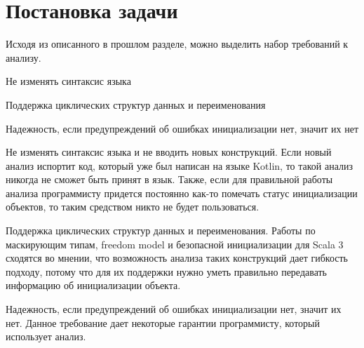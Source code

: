 \chapter{Постановка задачи}\label{ch:постановка-задачи}


Исходя из описанного в прошлом разделе, можно выделить набор требований к анализу.
\begin{itemize*}
    \item Не изменять синтаксис языка
    \item Поддержка циклических структур данных и переименования
    \item Надежность, если предупреждений об ошибках инициализации нет, значит их нет
\end{itemize*}

Не изменять синтаксис языка и не вводить новых конструкций.
Если новый анализ испортит код, который уже был написан на языке Kotlin, то такой анализ никогда не сможет быть принят в язык.
Также, если для правильной работы анализа программисту придется постоянно как-то помечать статус инициализации объектов,
то таким средством никто не будет пользоваться.

Поддержка циклических структур данных и переименования.
Работы по маскирующим типам, freedom model и безопасной инициализации для Scala 3 сходятся во мнении,
что возможность анализа таких конструкций дает гибкость подходу,
потому что для их поддержки нужно уметь правильно передавать информацию об инициализации объекта.

Надежность, если предупреждений об ошибках инициализации нет, значит их нет.
Данное требование дает некоторые гарантии программисту, который использует анализ.

